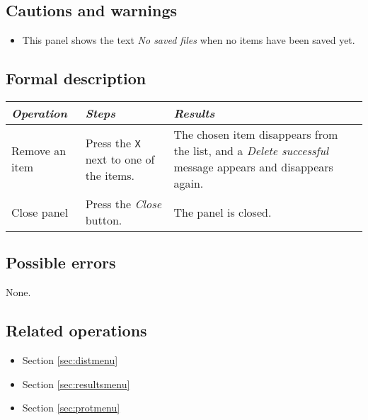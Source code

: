   \subsection*{Cautions and warnings}
  \begin{itemize}
  \item This panel shows the text \emph{No saved files} when no items have been saved yet.
  \end{itemize}

  \subsection*{Formal description}
    \begin{tabularx}{\textwidth}{XXX}
    \toprule
    \emph{Operation} & \emph{Steps} & \emph{Results} \\
    \midrule
    Remove an item & Press the \texttt{X} next to one of the items. &  The chosen item disappears from the list, and a \emph{Delete successful} message appears and disappears again. \\
    \midrule
    Close panel & Press the \emph{Close} button. & The panel is closed. \\
    \bottomrule
\end{tabularx}

  \subsection*{Possible errors}
  None.

  \subsection*{Related operations}
   \begin{itemize}
   \item Section \ref{sec:distmenu}
   \item Section \ref{sec:resultsmenu}
   \item Section \ref{sec:protmenu}
  \end{itemize}
  
